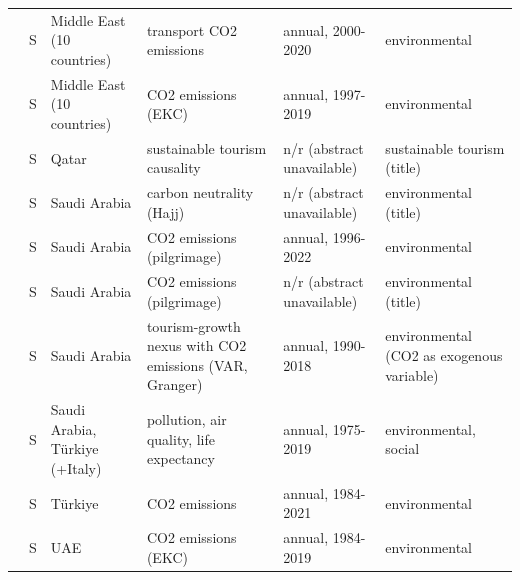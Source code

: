\begin{tabularx}{\linewidth}{@{}p{3.2cm}p{1.0cm}p{3.4cm}p{5.2cm}p{4.3cm}p{5.0cm}@{}}
\citet{BinSurayhid2026} & S & Middle East (10 countries) & transport CO2 emissions & annual, 2000-2020 & environmental \\
\citet{Voumik2023} & S & Middle East (10 countries) & CO2 emissions (EKC) & annual, 1997-2019 & environmental \\
\citet{Nair2016} & S & Qatar & sustainable tourism causality & n/r (abstract unavailable) & sustainable tourism (title) \\
\citet{Raihan2025} & S & Saudi Arabia & carbon neutrality (Hajj) & n/r (abstract unavailable) & environmental (title) \\
\citet{Naseem2025} & S & Saudi Arabia & CO2 emissions (pilgrimage) & annual, 1996-2022 & environmental \\
\citet{Ozturk2021} & S & Saudi Arabia & CO2 emissions (pilgrimage) & n/r (abstract unavailable) & environmental (title) \\
\citet{Jamel2020} & S & Saudi Arabia & tourism-growth nexus with CO2 emissions (VAR, Granger) & annual, 1990-2018 & environmental (CO2 as exogenous variable) \\
\citet{Bildirici2025} & S & Saudi Arabia, T\"urkiye (+Italy) & pollution, air quality, life expectancy & annual, 1975-2019 & environmental, social \\
\citet{Bahar2023} & S & T\"urkiye & CO2 emissions & annual, 1984-2021 & environmental \\
\citet{Majumdar2022} & S & UAE & CO2 emissions (EKC) & annual, 1984-2019 & environmental \\
\bottomrule
\end{tabularx}
